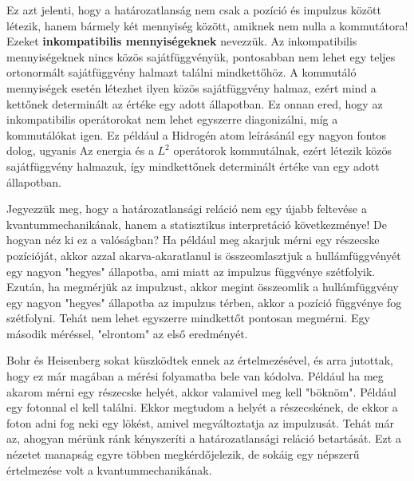 \documentclass[../main.tex]{subfiles}
\begin{document}
Ez azt jelenti, hogy a határozatlanság nem csak a pozíció és impulzus között létezik, hanem bármely két mennyiség között, amiknek nem nulla a kommutátora! Ezeket \textbf{inkompatibilis mennyiségeknek} nevezzük.
Az inkompatibilis mennyiségeknek nincs közös sajátfüggvényük, pontosabban nem lehet egy teljes ortonormált sajátfüggvény halmazt találni mindkettőhöz. A kommutáló mennyiségek esetén
létezhet ilyen közös sajátfüggvény halmaz, ezért mind a kettőnek determinált az értéke egy adott állapotban. Ez onnan ered, hogy az inkompatibilis operátorokat nem lehet egyszerre diagonizálni, míg a kommutálókat igen.
Ez például a Hidrogén atom leírásánál egy nagyon fontos dolog, ugyanis Az energia és a $L^2$ operátorok kommutálnak, ezért létezik közös sajátfüggvény halmazuk, így mindkettőnek determinált értéke van egy adott állapotban.

Jegyezzük meg, hogy a határozatlansági reláció nem egy újabb feltevése a kvantummechanikának, hanem a statisztikus interpretáció következménye! De hogyan néz ki ez a valóságban?
Ha például meg akarjuk mérni egy részecske pozícióját, akkor azzal akarva-akaratlanul is összeomlasztjuk a hullámfüggvényét egy nagyon "hegyes" állapotba, ami miatt az impulzus függvénye szétfolyik.
Ezután, ha megmérjük az impulzust, akkor megint összeomlik a hullámfüggvény egy nagyon "hegyes" állapotba az impulzus térben, akkor a pozíció függvénye fog szétfolyni. Tehát nem lehet egyszerre mindkettőt pontosan megmérni.
Egy második méréssel, "elrontom" az első eredményét. 

Bohr és Heisenberg sokat küszködtek ennek az értelmezésével, és arra jutottak, hogy ez már magában a mérési folyamatba bele van kódolva. Például ha meg akarom mérni egy részecske helyét, akkor valamivel
meg kell "böknöm". Például egy fotonnal el kell találni. Ekkor megtudom a helyét a részecskének, de ekkor a foton adni fog neki egy lökést, amivel megváltoztatja az impulzusát. Tehát már az, ahogyan mérünk
ránk kényszeríti a határozatlansági reláció betartását. Ezt a nézetet manapság egyre többen megkérdőjelezik, de sokáig egy népszerű értelmezése volt a kvantummechanikának.
\end{document}
